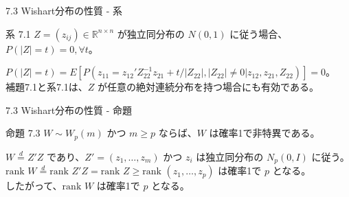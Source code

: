 \documentclass[aspectratio=169]{beamer}
\begin{document}
\begin{frame}{7.3 Wishart分布の性質 - 系}
\begin{block}{系 7.1}
$Z = (z_{ij}) \in \mathbb{R}^{n \times n}$ が独立同分布の $N(0, 1)$ に従う場合、$P(|Z| = t) = 0, \forall t$。
\end{block}

$P(|Z| = t) = E[P(z_{11} = z_{12}'Z_{22}^{-1}z_{21} + t/|Z_{22}|, |Z_{22}| \ne 0 | z_{12}, z_{21}, Z_{22})] = 0$。\\
補題7.1と系7.1は、$Z$ が任意の絶対連続分布を持つ場合にも有効である。
\end{frame}

\begin{frame}{7.3 Wishart分布の性質 - 命題}
\begin{block}{命題 7.3}
$W \sim W_p(m)$ かつ $m \ge p$ ならば、$W$ は確率1で非特異である。
\end{block}

$W \overset{d}{=} Z'Z$ であり、$Z' = (z_1, \dots, z_m)$ かつ $z_i$ は独立同分布の $N_p(0, I)$ に従う。\\
$\text{rank } W \overset{d}{=} \text{rank } Z'Z = \text{rank } Z \ge \text{rank } (z_1, \dots, z_p)$ は確率1で $p$ となる。\\
したがって、$\text{rank } W$ は確率1で $p$ となる。
\end{frame}
\end{document}
